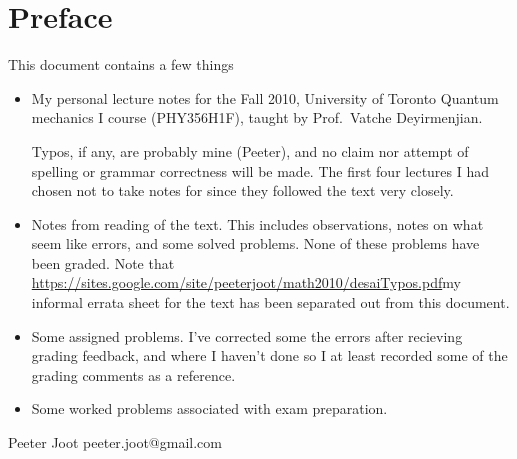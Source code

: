 \chapter*{Preface}\normalsize

This document contains a few things

\begin{itemize}
\item My personal lecture notes for the Fall 2010, University of Toronto Quantum mechanics I course (PHY356H1F), taught by Prof.\ Vatche Deyirmenjian.

Typos, if any, are probably mine (Peeter), and no claim nor attempt of spelling or grammar correctness will be made.  The first four lectures I had chosen not to take notes for since they followed the text \citep{desai2009quantum} very closely.

\item Notes from reading of the text.  This includes observations, notes on what seem like errors, and some solved problems.  None of these problems have been graded.  Note that \url{https://sites.google.com/site/peeterjoot/math2010/desaiTypos.pdf}{my informal errata sheet} for the text has been separated out from this document.

\item Some assigned problems.  I've corrected some the errors after recieving grading feedback, and where I haven't done so I at least recorded some of the grading comments as a reference.

\item Some worked problems associated with exam preparation.

\end{itemize}

Peeter Joot  \quad peeter.joot@gmail.com 

